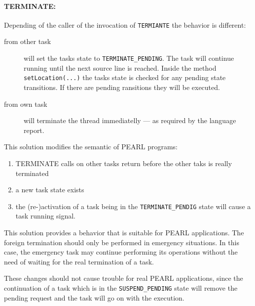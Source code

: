 \paragraph{TERMINATE:}
Depending of the caller of the invocation of \verb|TERMIANTE| the behavior
is different:
\begin{description}
\item[from other task] will set the tasks state to \verb|TERMINATE_PENDING|. 
   The task will continue running until the next source line is reached. 
   Inside the method \verb|setLocation(...)| the tasks state is checked for
   any pending state transitions. If there are pending ransitions they will 
   be executed.
\item[from own task] will terminate the thread immediatelly ---
   as required by the language report.
\end{description}

This solution modifies the semantic of PEARL programs:
\begin{enumerate}
\item TERMINATE calls on other tasks return before the other taks is really 
    terminated
\item a new task state exists
\item the (re-)activation of a task being in the \verb|TERMINATE_PENDIG| 
   state will cause a task running signal. 
\end{enumerate}

This solution provides a behavior that is suitable for PEARL applications.
The foreign termination should only be performed in emergency situations.
In this case, the emergency task may continue performing its operations
without the need of waiting for the real termination of a task.


These changes should not cause trouble for real PEARL applications, since
the continuation of a task which is in the \verb|SUSPEND_PENDING| state
will remove the pending request and the task will go on with the execution.


